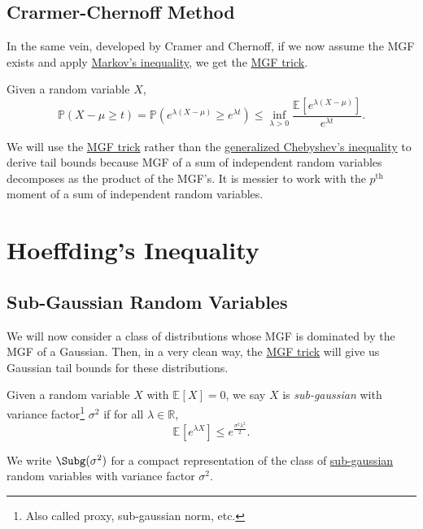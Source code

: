 \subsection{Crarmer-Chernoff Method}
In the same vein, developed by Cramer and Chernoff, if we now assume the MGF exists and apply \hyperref[lma:Markov-inequality]{Markov's inequality}, we get the \hyperref[lma:MGF-trick]{MGF trick}.

\begin{lemma}\label{lma:MGF-trick}
  Given a random variable \(X\),
  \[
    \mathbb{P} (X - \mu \geq t) = \mathbb{P} (e^{\lambda (X - \mu ) } \geq e^{\lambda t}) \leq \inf _{\lambda > 0} \frac{\mathbb{E}_{}\left[e^{\lambda (X - \mu )} \right] }{e^{\lambda t}}.
  \]
\end{lemma}

We will use the \hyperref[lma:MGF-trick]{MGF trick} rather than the \hyperref[lma:Chebyshev-inequality]{generalized Chebyshev's inequality} to derive tail bounds because MGF of a sum of independent random variables decomposes as the product of the MGF's. It is messier to work with the \(p^{\text{th} } \) moment of a sum of independent random variables.

\section{Hoeffding's Inequality}
\subsection{Sub-Gaussian Random Variables}
We will now consider a class of distributions whose MGF is dominated by the MGF of a Gaussian. Then, in a very clean way, the \hyperref[lma:MGF-trick]{MGF trick} will give us Gaussian tail bounds for these distributions.

\begin{definition}\label{def:sub-gaussian}
  Given a random variable \(X\) with \(\mathbb{E}_{}\left[X \right] = 0\), we say \(X\) is \emph{sub-gaussian} with variance factor\footnote{Also called proxy, sub-gaussian norm, etc.} \(\sigma ^2\) if for all \(\lambda \in \mathbb{R} \),
  \[
    \mathbb{E}_{}\left[e^{\lambda X} \right] \leq e^{\frac{\sigma ^2 \lambda ^2}{2}}.
  \]
\end{definition}

\begin{notation}
  We write \(\Subg(\sigma ^{2} ) \) for a compact representation of the class of \hyperref[def:sub-gaussian]{sub-gaussian} random variables with variance factor \(\sigma ^{2} \).
\end{notation}

